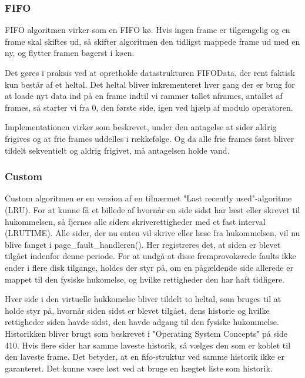 \subsubsection*{FIFO}
FIFO algoritmen virker som en FIFO kø. Hvis ingen frame er tilgængelig og en frame skal skiftes ud, så skifter algoritmen den tidligst mappede frame ud med en ny, og flytter framen bagerst i køen.

Det gøres i praksis ved at opretholde datastrukturen FIFOData, der rent faktisk kun består af et heltal. Det heltal bliver inkrementeret hver gang der er brug for at loade nyt data ind på en frame indtil vi rammer tallet nframes, antallet af frames, så starter vi fra 0, den første side, igen ved hjælp af modulo operatoren.

Implementationen virker som beskrevet, under den antagelse at sider aldrig frigives og at frie frames uddelles i rækkefølge. Og da alle frie frames først bliver tildelt sekventielt og aldrig frigivet, må antagelsen holde vand.


\subsubsection*{Custom}
\label{subsubsec:custom}
Custom algoritmen er en version af en tilnærmet "Last recently used"-algoritme (LRU). For at kunne få et billede af hvornår en side sidst har læst eller skrevet til hukommelsen, så fjernes alle siders skriverettigheder med et fast interval (LRUTIME). Alle sider, der nu enten vil skrive eller læse fra hukommelsen, vil nu blive fanget i page\_fault\_handleren(). Her registreres det, at siden er blevet tilgået indenfor denne periode. For at undgå at disse fremprovokerede faults ikke ender i flere disk tilgange, holdes der styr på, om en pågældende side allerede er mappet til den fysiske hukomelse, og hvilke rettigheder den har haft tidligere.

Hver side i den virtuelle hukkomelse bliver tildelt to heltal, som bruges til at holde styr på, hvornår siden sidst er blevet tilgået, dens historie og hvilke rettigheder siden havde sidst, den havde adgang til den fysiske hukommelse. Historikken bliver brugt som beskrevet i "Operating System Concepts" på side 410. Hvis flere sider har samme laveste historik, så vælges den som er koblet til den laveste frame. Det betyder, at en fifo-struktur ved samme historik ikke er garanteret. Det kunne være løst ved at bruge en hægtet liste som historik.
